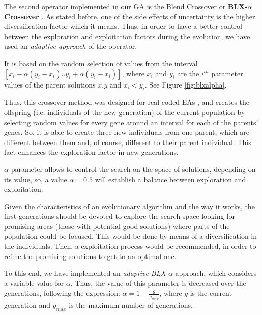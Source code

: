 \documentclass[10pt,journal,compsoc]{IEEEtran}
\begin{document}
The second operator implemented in our GA is the Blend Crossover or  \textbf{BLX-$\alpha$ Crossover} \cite{blx2008}. As stated before, one of the side effects of uncertainty is the higher diversification factor which it means. Thus, in order to have a better control between the exploration and exploitation factors during the evolution, we have used an \textit{adaptive approach} of the operator.

It is based on the random selection of values from the interval
$[x_i-\alpha(y_i-x_i).. y_i+\alpha(y_i-x_i)]$, where $x_i$ and $y_i$
are the $i^{th}$ parameter values of the parent solutions $x$,$y$ and
$x_i < y_i$. See Figure \ref{fig:blxalpha}.
%

Thus, this crossover method was designed for real-coded EAs \cite{blx2008}, and creates the offspring (i.e. individuals of the new generation) of the current population by selecting random values for every gene around an interval for each of the parents' genes. So, it is able to create three new individuals from one parent, which are different between them and, of course, different to their parent individual. This fact enhances the exploration factor in new generations.

$\alpha$ parameter allows to control the search on the space of solutions, depending on its value, so, a value $\alpha = 0.5$ will establish a balance between exploration and exploitation.

Given the characteristics of an evolutionary algorithm and the way it works, the first generations should be devoted to explore the search space looking for promising areas (those with potential good solutions) where parts of the population could be focused. This would be done by means of a diversification in the individuals. Then, a exploitation process would be recommended, in order to refine the promising solutions to get to an optimal one.

To this end, we have implemented an \textit{adaptive BLX-$\alpha$}
approach, which considers a variable value for $\alpha$. Thus, the
value of this parameter is decreased over the generations, following
the expression: $\alpha =1-\frac{g}{g_{max}}$, where $g$ is the
current generation and $g_{max}$ is the maximum number of generations.
\end{document}

